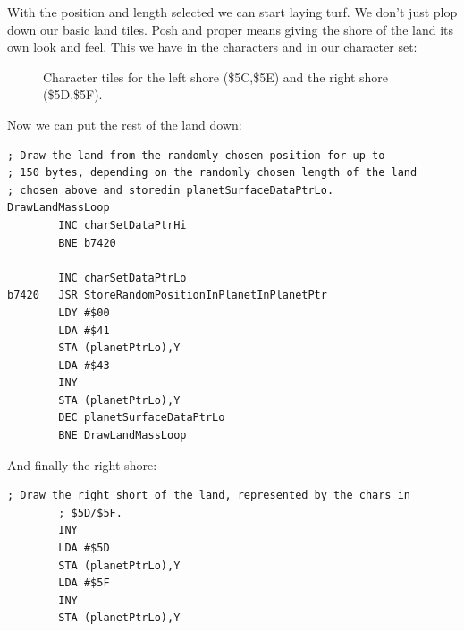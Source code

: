 With the position and length selected we can start laying turf. We don't just plop down our basic land tiles. Posh
and proper means giving the shore of the land its own look and feel. This we have in the characters  and
 in our character set: 

\begin{figure}[H]
{
  \setlength{\tabcolsep}{3.0pt}
  \setlength\cmidrulewidth{\heavyrulewidth} %
    \begin{adjustbox}{width=15cm,center}
  \begin{subfigure}{0.3\textwidth}
  
  \end{subfigure}
  \begin{subfigure}{0.3\textwidth}
  
  \end{subfigure}
  \begin{subfigure}{0.3\textwidth}
  
  \end{subfigure}
  \begin{subfigure}{0.3\textwidth}
  
  \end{subfigure}
  \end{adjustbox}
}\caption[]{Character tiles for the left shore (\$5C,\$5E) and the right shore (\$5D,\$5F).}
\end{figure}

Now we can put the rest of the land down:

\begin{lstlisting}[caption=Write pairs of \icode{\$41,\$43} for the main land mass.]
; Draw the land from the randomly chosen position for up to
; 150 bytes, depending on the randomly chosen length of the land
; chosen above and storedin planetSurfaceDataPtrLo.
DrawLandMassLoop   
        INC charSetDataPtrHi
        BNE b7420

        INC charSetDataPtrLo
b7420   JSR StoreRandomPositionInPlanetInPlanetPtr
        LDY #$00
        LDA #$41
        STA (planetPtrLo),Y
        LDA #$43
        INY
        STA (planetPtrLo),Y
        DEC planetSurfaceDataPtrLo
        BNE DrawLandMassLoop
\end{lstlisting}

And finally the right shore:

\begin{lstlisting}[caption=Drawing the right hand shore..]
        ; Draw the right short of the land, represented by the chars in
        ; $5D/$5F.
        INY
        LDA #$5D
        STA (planetPtrLo),Y
        LDA #$5F
        INY
        STA (planetPtrLo),Y
\end{lstlisting}


